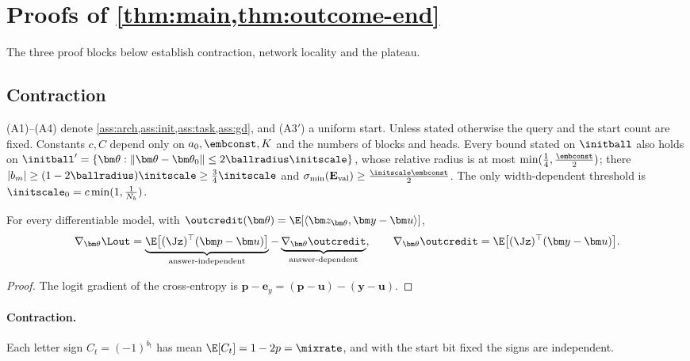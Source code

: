 \section{Proofs of \texorpdfstring{\cref{thm:main,thm:outcome-end}}{Lemma 1 and Theorem 1(ii)}}
\label{app:damping-proof}
\label{app:mainproofs}
\label{app:credit-proof}

The three proof blocks below establish contraction, network locality and the plateau.

\subsection{Contraction}
\label{app:C-fourier}
\label{app:assumptions}




(A1)--(A4) denote \cref{ass:arch,ass:init,ass:task,ass:gd}, and (A3$'$) a uniform start. Unless stated otherwise the query and the start
count are fixed. Constants $c,C$ depend only on $a_0,\embconst,K$ and the numbers of blocks and heads. Every bound stated on $\initball$ also
holds on $\initball'=\{\bm\theta:\|\bm\theta-\bm\theta_0\|\le2\ballradius\initscale\}$, whose relative radius is at most $\min(\frac{1}{4},\frac{\embconst}{2})$; there
$|b_m|\ge(1-2\ballradius)\initscale\ge\frac{3}{4}\initscale$ and $\sigma_{\min}(\mathbf E_{\mathrm{val}})\ge\frac{\initscale\embconst}{2}$. The only width-dependent threshold is $\initscale_0=c\min(1,\frac{1}{N_b})$.

\begin{lemma}
\label{lem:gradient-split}
For every differentiable model, with $\outcredit(\bm\theta)=\E[\langle\bm z_{\bm\theta},\bm y-\bm u\rangle]$,
\[
 \nabla_{\bm\theta}\Lout=\underbrace{\E\bigl[(\Jz)^\top(\bm p-\bm u)\bigr]}_{\text{answer-independent}}-\underbrace{\nabla_{\bm\theta}\outcredit}_{\text{answer-dependent}},\qquad
 \nabla_{\bm\theta}\outcredit=\E\bigl[(\Jz)^\top(\bm y-\bm u)\bigr].
\]
\end{lemma}

\begin{proof}
The logit gradient of the cross-entropy is $\bm p-\bm e_y=(\bm p-\bm u)-(\bm y-\bm u)$.
\end{proof}

\paragraph{Contraction.}\label{app:contraction}\label{app:target-spectrum} Each letter sign $C_t=(-1)^{b_t}$ has mean
$\E[C_t]=1-2p=\mixrate$, and with the start bit fixed the signs are independent.

